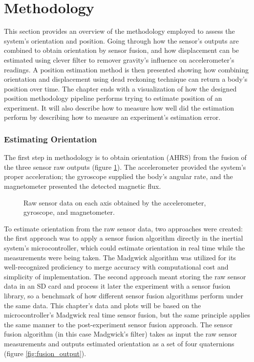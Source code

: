 \section{Methodology}

This section provides an overview of the methodology employed to assess the system's orientation and position. Going through how the sensor's outputs are combined to obtain orientation by sensor fusion, and how displacement can be estimated using clever filter to remover gravity's influence on accelerometer's readings. A position estimation method is then presented showing how combining orientation and displacement using dead reckoning technique can return a body's position over time. The chapter ends with a visualization of how the designed position methodology pipeline performs trying to estimate position of an experiment. It will also describe how to measure how well did the estimation perform by describing how to measure an experiment's estimation error.


\subsubsection{Estimating Orientation}

The first step in methodology is to obtain orientation (AHRS) from the fusion of the three sensor raw outputs (figure \ref{fig:raw}). The accelerometer provided the system's proper acceleration; the gyroscope supplied the body's angular rate, and the magnetometer presented the detected magnetic flux.

\begin{figure}[!h]
    \centering
    \resizebox{0.75\linewidth}{!}{}
    \caption{Raw sensor data on each axis obtained by the accelerometer, gyroscope, and magnetometer.}
    \label{fig:raw}
\end{figure}

To estimate orientation from the raw sensor data, two approaches were created: the first approach was to apply a sensor fusion algorithm directly in the inertial system's microcontroller, which could estimate orientation in real time while the measurements were being taken. The Madgwick algorithm was utilized for its well-recognized proficiency to merge accuracy with computational cost and simplicity of implementation. The second approach meant storing the raw sensor data in an SD card and process it later the experiment with a sensor fusion library, so a benchmark of how different sensor fusion algorithms perform under the same data. This chapter's data and plots will be based on the microcontroller's Madgwick real time sensor fusion, but the same principle applies the same manner to the post-experiment sensor fusion approach. The sensor fusion algorithm (in this case Madgwick's filter) takes as input the raw sensor measurements and outputs estimated orientation as a set of four quaternions (figure \ref{fig:fusion_output}).

